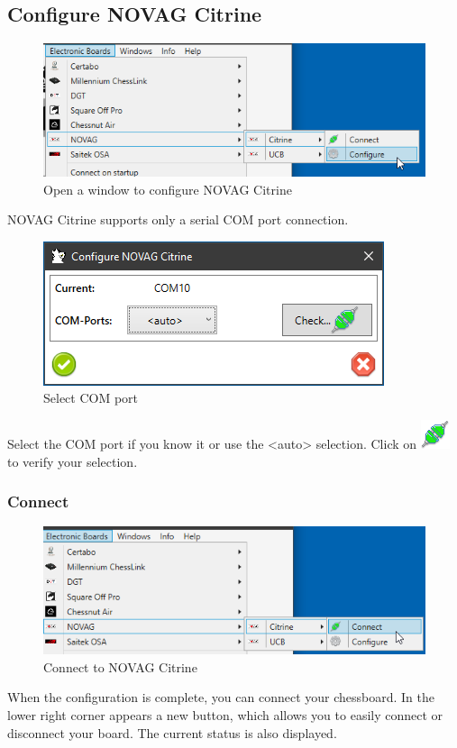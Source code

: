 \documentclass[11pt,a4paper]{article}
\begin{document}
\subsection{Configure NOVAG Citrine} \label{ConfigureNovagCitrine}

\begin{figure}[H]
	\centering
	\includegraphics[scale=0.8]{NovagCitrine1.png}
	\caption{Open a window to configure NOVAG Citrine }
	\label{fig:NovagCtrine1}
\end{figure}

NOVAG Citrine supports only a serial COM port connection.

\begin{figure}[H]
	\centering
	\includegraphics[scale=1.0]{NovagCitrine2.png}
	\caption{Select COM port}
	\label{fig:NovagCtrine2}
\end{figure}

Select the COM port if you know it or use the <auto> selection. 
Click on \includegraphics[scale=0.5]{connect.png} to verify your selection.

\subsubsection{Connect}
\begin{figure}[H]
	\centering
	\includegraphics[scale=0.8]{NovagCitrine3.png}
	\caption{Connect to NOVAG Citrine}
	\label{fig:NovagCitrine3}
\end{figure}
When the configuration is complete, you can connect your chessboard.
In the lower right corner appears a new button, which allows you to easily connect or disconnect your board. The current status is also displayed.
\end{document}

